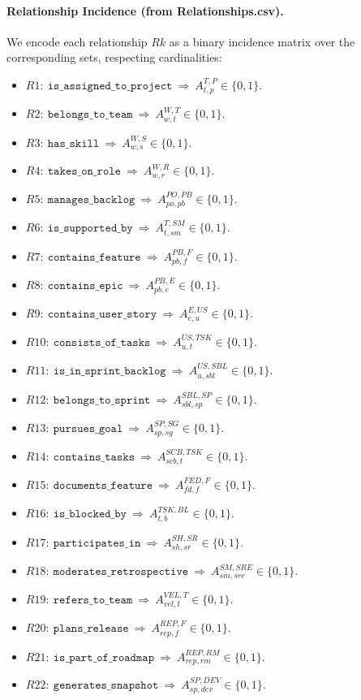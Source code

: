 \documentclass[a4paper,11pt]{article}
\begin{document}
\paragraph{Relationship Incidence (from Relationships.csv).}
We encode each relationship $Rk$ as a binary incidence matrix over the corresponding sets, respecting cardinalities:
\begin{itemize}[leftmargin=2.2em]
  \item $R1:\ \texttt{is\_assigned\_to\_project}\ \Rightarrow\ A^{T,P}_{t,p}\in\{0,1\}$.
  \item $R2:\ \texttt{belongs\_to\_team}\ \Rightarrow\ A^{W,T}_{w,t}\in\{0,1\}$.
  \item $R3:\ \texttt{has\_skill}\ \Rightarrow\ A^{W,S}_{w,s}\in\{0,1\}$.
  \item $R4:\ \texttt{takes\_on\_role}\ \Rightarrow\ A^{W,R}_{w,r}\in\{0,1\}$.
  \item $R5:\ \texttt{manages\_backlog}\ \Rightarrow\ A^{PO,PB}_{po,pb}\in\{0,1\}$.
  \item $R6:\ \texttt{is\_supported\_by}\ \Rightarrow\ A^{T,SM}_{t,sm}\in\{0,1\}$.
  \item $R7:\ \texttt{contains\_feature}\ \Rightarrow\ A^{PB,F}_{pb,f}\in\{0,1\}$.
  \item $R8:\ \texttt{contains\_epic}\ \Rightarrow\ A^{PB,E}_{pb,e}\in\{0,1\}$.
  \item $R9:\ \texttt{contains\_user\_story}\ \Rightarrow\ A^{E,US}_{e,u}\in\{0,1\}$.
  \item $R10:\ \texttt{consists\_of\_tasks}\ \Rightarrow\ A^{US,TSK}_{u,t}\in\{0,1\}$.
  \item $R11:\ \texttt{is\_in\_sprint\_backlog}\ \Rightarrow\ A^{US,SBL}_{u,sbl}\in\{0,1\}$.
  \item $R12:\ \texttt{belongs\_to\_sprint}\ \Rightarrow\ A^{SBL,SP}_{sbl,sp}\in\{0,1\}$.
  \item $R13:\ \texttt{pursues\_goal}\ \Rightarrow\ A^{SP,SG}_{sp,sg}\in\{0,1\}$.
  \item $R14:\ \texttt{contains\_tasks}\ \Rightarrow\ A^{SCB,TSK}_{scb,t}\in\{0,1\}$.
  \item $R15:\ \texttt{documents\_feature}\ \Rightarrow\ A^{FED,F}_{fd,f}\in\{0,1\}$.
  \item $R16:\ \texttt{is\_blocked\_by}\ \Rightarrow\ A^{TSK,BL}_{t,b}\in\{0,1\}$.
  \item $R17:\ \texttt{participates\_in}\ \Rightarrow\ A^{SH,SR}_{sh,sr}\in\{0,1\}$.
  \item $R18:\ \texttt{moderates\_retrospective}\ \Rightarrow\ A^{SM,SRE}_{sm,sre}\in\{0,1\}$.
  \item $R19:\ \texttt{refers\_to\_team}\ \Rightarrow\ A^{VEL,T}_{vel,t}\in\{0,1\}$.
  \item $R20:\ \texttt{plans\_release}\ \Rightarrow\ A^{REP,F}_{rep,f}\in\{0,1\}$.
  \item $R21:\ \texttt{is\_part\_of\_roadmap}\ \Rightarrow\ A^{REP,RM}_{rep,rm}\in\{0,1\}$.
  \item $R22:\ \texttt{generates\_snapshot}\ \Rightarrow\ A^{SP,DEV}_{sp,dev}\in\{0,1\}$.
\end{itemize}
\end{document}
